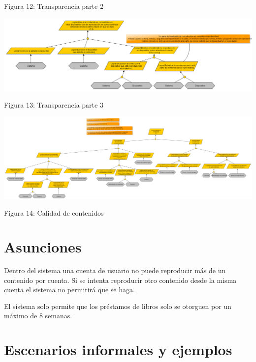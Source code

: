 \documentclass[11pt, a4paper, spanish]{article}
\begin{document}
	\begin{center}
		\small{Figura 12: Transparencia parte 2}
	\end{center}
\newpage
	\begin{center}
		\includegraphics[scale=0.43, angle=90]{Diagramas/3-3ModelodeObjetivosTransparencia.png}
	\end{center}
	\begin{center}
		\small{Figura 13: Transparencia parte 3}
	\end{center}
\newpage
	\begin{center}
		\includegraphics[scale=0.25, angle=90]{Diagramas/4ModelodeObjetivosCalidaddecontenidos.png}
	\end{center}
	\begin{center}
		\small{Figura 14: Calidad de contenidos}
	\end{center}
\newpage


\section{Asunciones}

	Dentro del sistema una cuenta de usuario no puede reproducir m\'as de un contenido por cuenta.
	Si se intenta reproducir otro contenido desde la misma cuenta el sistema no permitir\'a que se haga. 

	El sistema solo permite que los pr\'estamos de libros solo se otorguen por un m\'aximo de 8 semanas.

\newpage

\section{Escenarios informales y ejemplos}
	
\end{document}
